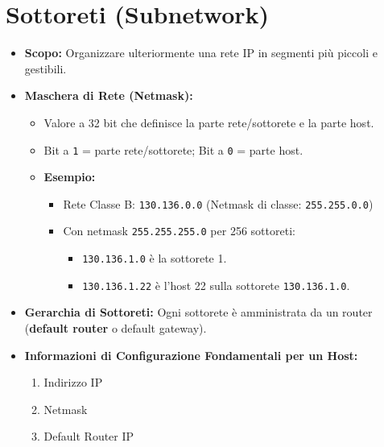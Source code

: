 \section{Sottoreti (Subnetwork)}
\begin{itemize}
    \item \textbf{Scopo:} Organizzare ulteriormente una rete IP in segmenti più piccoli e gestibili.
    \item \textbf{Maschera di Rete (Netmask):}
    \begin{itemize}
        \item Valore a 32 bit che definisce la parte rete/sottorete e la parte host.
        \item Bit a \texttt{1} = parte rete/sottorete; Bit a \texttt{0} = parte host.
        \item \textbf{Esempio:}
        \begin{itemize}
            \item Rete Classe B: \texttt{130.136.0.0} (Netmask di classe: \texttt{255.255.0.0})
            \item Con netmask \texttt{255.255.255.0} per 256 sottoreti:
            \begin{itemize}
                \item \texttt{130.136.1.0} è la sottorete 1.
                \item \texttt{130.136.1.22} è l'host 22 sulla sottorete \texttt{130.136.1.0}.
            \end{itemize}
        \end{itemize}
    \end{itemize}
    \item \textbf{Gerarchia di Sottoreti:} Ogni sottorete è amministrata da un router (\textbf{default router} o default gateway).
    \item \textbf{Informazioni di Configurazione Fondamentali per un Host:}
    \begin{enumerate}
        \item Indirizzo IP
        \item Netmask
        \item Default Router IP
    \end{enumerate}
\end{itemize}

